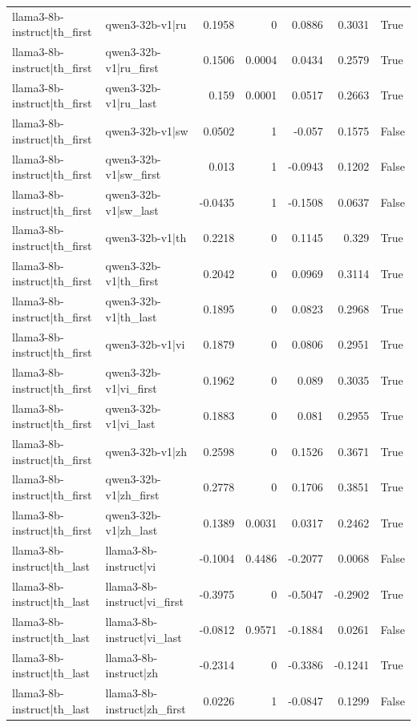 \begin{table}
\begin{tabular}{l l r r r r l}
llama3-8b-instruct|th_first & qwen3-32b-v1|ru & 0.1958 & 0 & 0.0886 & 0.3031 & True \\
llama3-8b-instruct|th_first & qwen3-32b-v1|ru_first & 0.1506 & 0.0004 & 0.0434 & 0.2579 & True \\
llama3-8b-instruct|th_first & qwen3-32b-v1|ru_last & 0.159 & 0.0001 & 0.0517 & 0.2663 & True \\
llama3-8b-instruct|th_first & qwen3-32b-v1|sw & 0.0502 & 1 & -0.057 & 0.1575 & False \\
llama3-8b-instruct|th_first & qwen3-32b-v1|sw_first & 0.013 & 1 & -0.0943 & 0.1202 & False \\
llama3-8b-instruct|th_first & qwen3-32b-v1|sw_last & -0.0435 & 1 & -0.1508 & 0.0637 & False \\
llama3-8b-instruct|th_first & qwen3-32b-v1|th & 0.2218 & 0 & 0.1145 & 0.329 & True \\
llama3-8b-instruct|th_first & qwen3-32b-v1|th_first & 0.2042 & 0 & 0.0969 & 0.3114 & True \\
llama3-8b-instruct|th_first & qwen3-32b-v1|th_last & 0.1895 & 0 & 0.0823 & 0.2968 & True \\
llama3-8b-instruct|th_first & qwen3-32b-v1|vi & 0.1879 & 0 & 0.0806 & 0.2951 & True \\
llama3-8b-instruct|th_first & qwen3-32b-v1|vi_first & 0.1962 & 0 & 0.089 & 0.3035 & True \\
llama3-8b-instruct|th_first & qwen3-32b-v1|vi_last & 0.1883 & 0 & 0.081 & 0.2955 & True \\
llama3-8b-instruct|th_first & qwen3-32b-v1|zh & 0.2598 & 0 & 0.1526 & 0.3671 & True \\
llama3-8b-instruct|th_first & qwen3-32b-v1|zh_first & 0.2778 & 0 & 0.1706 & 0.3851 & True \\
llama3-8b-instruct|th_first & qwen3-32b-v1|zh_last & 0.1389 & 0.0031 & 0.0317 & 0.2462 & True \\
llama3-8b-instruct|th_last & llama3-8b-instruct|vi & -0.1004 & 0.4486 & -0.2077 & 0.0068 & False \\
llama3-8b-instruct|th_last & llama3-8b-instruct|vi_first & -0.3975 & 0 & -0.5047 & -0.2902 & True \\
llama3-8b-instruct|th_last & llama3-8b-instruct|vi_last & -0.0812 & 0.9571 & -0.1884 & 0.0261 & False \\
llama3-8b-instruct|th_last & llama3-8b-instruct|zh & -0.2314 & 0 & -0.3386 & -0.1241 & True \\
llama3-8b-instruct|th_last & llama3-8b-instruct|zh_first & 0.0226 & 1 & -0.0847 & 0.1299 & False \\

\end{tabular}
\end{table}
